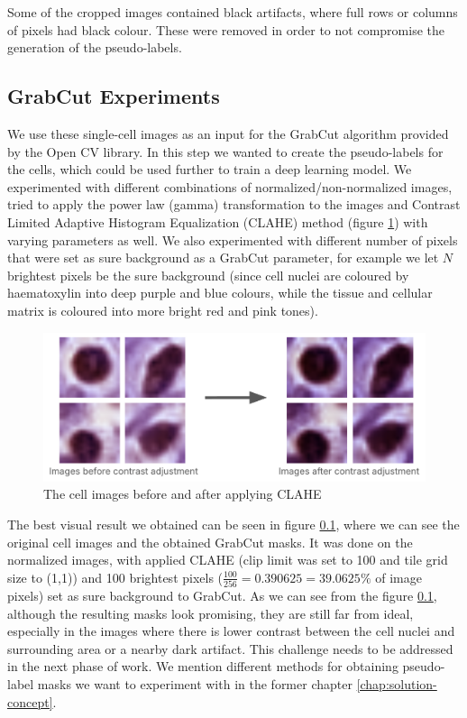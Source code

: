 Some of the cropped images contained black artifacts, where full rows or columns of pixels had black colour. These were removed in order to not compromise the generation of the pseudo-labels.

\subsection{GrabCut Experiments}
We use these single-cell images as an input for the GrabCut algorithm provided by the Open CV library. In this step we wanted to create the pseudo-labels for the cells, which could be used further to train a deep learning model. We experimented with different combinations of normalized/non-normalized images, tried to apply the power law (gamma) transformation to the images and Contrast Limited Adaptive Histogram Equalization (CLAHE) method (figure \ref{fig:work-clahe}) with varying parameters as well. We also experimented with different number of pixels that were set as sure background as a GrabCut parameter, for example we let $N$ brightest pixels be the sure background (since cell nuclei are coloured by haematoxylin into deep purple and blue colours, while the tissue and cellular matrix is coloured into more bright red and pink tones). 

\begin{figure}[H]
    \begin{centering}
    \includegraphics[width=14cm]{assets/images/work-cont-adj.png}
    \par\end{centering}
    \caption{The cell images before and after applying CLAHE}
    \label{fig:work-clahe}
\end{figure}

The best visual result we obtained can be seen in figure \ref{}, where we can see the original cell images and the obtained GrabCut masks. It was done on the normalized images, with applied CLAHE (clip limit was set to 100 and tile grid size to (1,1)) and 100 brightest pixels ($\frac{100}{256} = 0.390625 = 39.0625\%$ of image pixels) set as sure background to GrabCut. As we can see from the figure \ref{}, although the resulting masks look promising, they are still far from ideal, especially in the images where there is lower contrast between the cell nuclei and surrounding area or a nearby dark artifact. This challenge needs to be addressed in the next phase of work. We mention different methods for obtaining pseudo-label masks we want to experiment with in the former chapter \ref{chap:solution-concept}. 


